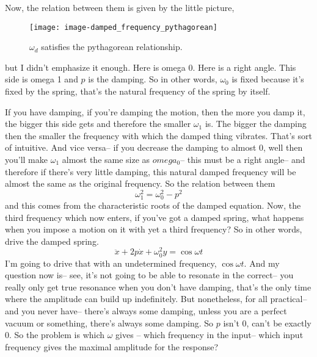 Now, the relation between them is
given by the little picture,
\begin{figure}[ht!]
  \centering
  \texttt{[image: image-damped\_frequency\_pythagorean]}
  \caption{ $\omega _d$ satisfies the pythagorean relationship.}
\end{figure}

but I didn't emphasize it enough.
Here is omega 0.
Here is a right angle.
This side is omega 1 and $p$ is the damping.
So in other words, $\omega _0$ is fixed because it's
fixed by the spring, that's the natural frequency
of the spring by itself.

If you have damping, if you're damping the motion,
then the more you damp it, the bigger this side gets
and therefore the smaller $\omega _1$ is.
The bigger the damping then the smaller
the frequency with which the damped thing vibrates.
That's sort of intuitive.
And vice versa-- if you decrease the damping to almost $0$,
well then you'll make $\omega _1$ almost the same size as $omega _0$--
this must be a right angle--
and therefore if there's very little damping,
this natural damped frequency will
be almost the same as the original frequency.
So the relation between them
\begin{equation*}
  \omega _1^2 = \omega _0^2 - p^2
\end{equation*}
and this comes from the characteristic roots
of the damped equation.
Now, the third frequency which now enters, 
if you've got a damped spring, what
happens when you impose a motion on it
with yet a third frequency?
So in other words, drive the damped spring.
\begin{equation*}
  \ddot x + 2p \dot x + \omega _0^2 y = \cos \omega t
\end{equation*}
I'm going to drive that with an undetermined frequency,
$\cos \omega t$.
And my question now is--
see, it's not going to be able to resonate in the correct--
you really only get true resonance
when you don't have damping, that's
the only time where the amplitude can build up
indefinitely.
But nonetheless, for all practical--
and you never have--
there's always some damping, unless you
are a perfect vacuum or something,
there's always some damping.
So $p$ isn't 0, can't be exactly 0.
So the problem is which $\omega$ gives --
which frequency in the input--
which input frequency gives the maximal
amplitude for the response?\\

